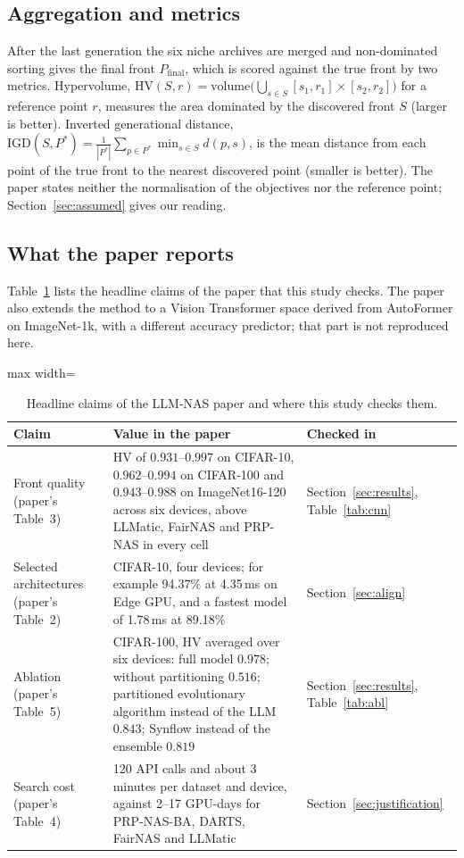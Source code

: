 \documentclass[preprint,12pt]{elsarticle}
\newcommand{\HV}{\mathrm{HV}}
\newcommand{\IGD}{\mathrm{IGD}}
\begin{document}
\subsection{Aggregation and metrics}
After the last generation the six niche archives are merged and non-dominated sorting gives the final front $P_{\mathrm{final}}$, which is scored against the true front by two metrics. Hypervolume, $\HV(S,r)=\mathrm{volume}\big(\bigcup_{s\in S}[s_1,r_1]\times[s_2,r_2]\big)$ for a reference point $r$, measures the area dominated by the discovered front $S$ (larger is better). Inverted generational distance, $\IGD(S,P^\ast)=\frac{1}{|P^\ast|}\sum_{p\in P^\ast}\min_{s\in S}d(p,s)$, is the mean distance from each point of the true front to the nearest discovered point (smaller is better). The paper states neither the normalisation of the objectives nor the reference point; Section~\ref{sec:assumed} gives our reading.

\subsection{What the paper reports}
Table~\ref{tab:claims} lists the headline claims of the paper that this study checks. The paper also extends the method to a Vision Transformer space derived from AutoFormer on ImageNet-1k, with a different accuracy predictor; that part is not reproduced here.

\begin{table}[h]\centering\small
\caption{Headline claims of the LLM-NAS paper and where this study checks them.}\label{tab:claims}
\begin{adjustbox}{max width=\linewidth}
\begin{tabular}{p{3.4cm}p{8.2cm}p{3.0cm}}
\toprule
Claim & Value in the paper & Checked in \\
\midrule
Front quality (paper's Table~3) & HV of $0.931$--$0.997$ on CIFAR-10, $0.962$--$0.994$ on CIFAR-100 and $0.943$--$0.988$ on ImageNet16-120 across six devices, above LLMatic, FairNAS and PRP-NAS in every cell & Section~\ref{sec:results}, Table~\ref{tab:cnn} \\
Selected architectures (paper's Table~2) & CIFAR-10, four devices; for example 94.37\% at 4.35\,ms on Edge GPU, and a fastest model of 1.78\,ms at 89.18\% & Section~\ref{sec:align} \\
Ablation (paper's Table~5) & CIFAR-100, HV averaged over six devices: full model $0.978$; without partitioning $0.516$; partitioned evolutionary algorithm instead of the LLM $0.843$; Synflow instead of the ensemble $0.819$ & Section~\ref{sec:results}, Table~\ref{tab:abl} \\
Search cost (paper's Table~4) & 120 API calls and about 3 minutes per dataset and device, against 2--17 GPU-days for PRP-NAS-BA, DARTS, FairNAS and LLMatic & Section~\ref{sec:justification} \\
\bottomrule
\end{tabular}
\end{adjustbox}
\end{table}
\end{document}
